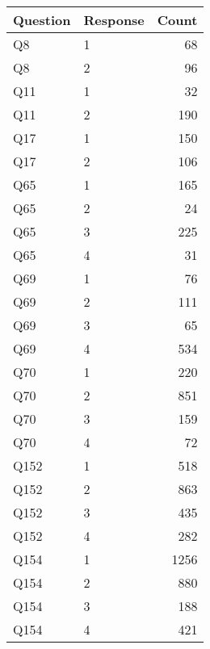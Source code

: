 \begin{tabular}{llr}
\toprule
Question & Response & Count \\
\midrule
Q8 & 1 & 68 \\
Q8 & 2 & 96 \\
Q11 & 1 & 32 \\
Q11 & 2 & 190 \\
Q17 & 1 & 150 \\
Q17 & 2 & 106 \\
Q65 & 1 & 165 \\
Q65 & 2 & 24 \\
Q65 & 3 & 225 \\
Q65 & 4 & 31 \\
Q69 & 1 & 76 \\
Q69 & 2 & 111 \\
Q69 & 3 & 65 \\
Q69 & 4 & 534 \\
Q70 & 1 & 220 \\
Q70 & 2 & 851 \\
Q70 & 3 & 159 \\
Q70 & 4 & 72 \\
Q152 & 1 & 518 \\
Q152 & 2 & 863 \\
Q152 & 3 & 435 \\
Q152 & 4 & 282 \\
Q154 & 1 & 1256 \\
Q154 & 2 & 880 \\
Q154 & 3 & 188 \\
Q154 & 4 & 421 \\
\bottomrule
\end{tabular}
